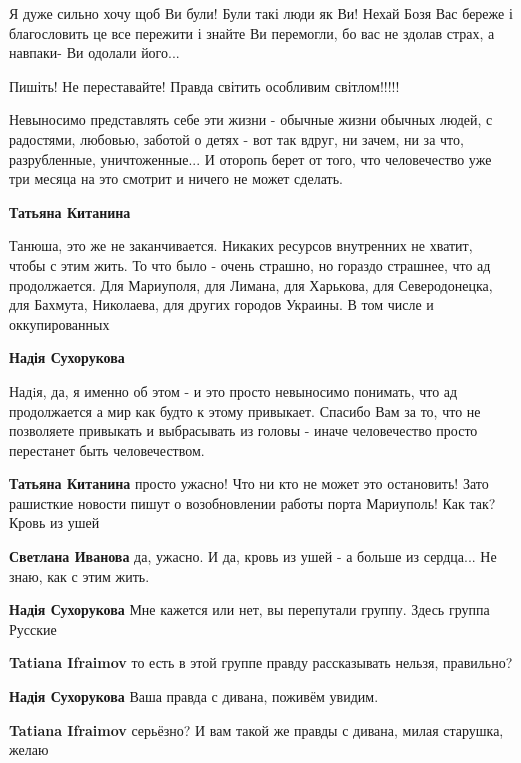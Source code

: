 \begin{itemize}

Я дуже сильно хочу щоб Ви були! Були такі люди як Ви! Нехай Бозя Вас береже і
благословить це все пережити і знайте Ви перемогли, бо вас не здолав страх, а
навпаки- Ви одолали його...

Пишіть! Не переставайте! Правда світить особливим світлом!!!!!


Невыносимо представлять себе эти жизни - обычные жизни обычных людей, с
радостями, любовью, заботой о детях - вот так вдруг, ни зачем, ни за что,
разрубленные, уничтоженные... И оторопь берет от того, что человечество уже три
месяца на это смотрит и ничего не может сделать.

\begin{itemize} %
\textbf{Татьяна Китанина} 

Танюша, это же не заканчивается. Никаких ресурсов внутренних не хватит, чтобы с
этим жить. То что было - очень страшно, но гораздо страшнее, что ад
продолжается. Для Мариуполя, для Лимана, для Харькова, для Северодонецка, для
Бахмута, Николаева, для других городов Украины. В том числе и оккупированных

\textbf{Надія Сухорукова} 

Надiя, да, я именно об этом - и это просто невыносимо понимать, что ад
продолжается а мир как будто к этому привыкает. Спасибо Вам за то, что не
позволяете привыкать и выбрасывать из головы - иначе человечество просто
перестанет быть человечеством.

\textbf{Татьяна Китанина} просто ужасно!
Что ни кто не может это остановить!
Зато рашисткие новости пишут о возобновлении работы порта Мариуполь!
Как так?
Кровь из ушей

\textbf{Светлана Иванова} да, ужасно. И да, кровь из ушей - а больше из сердца... Не знаю, как с этим жить.

\textbf{Надія Сухорукова} Мне кажется или нет, вы перепутали группу. Здесь группа Русские

\textbf{Tatiana Ifraimov} то есть в этой группе правду рассказывать нельзя, правильно?

\textbf{Надія Сухорукова} Ваша правда с дивана, поживём увидим.

\textbf{Tatiana Ifraimov} серьёзно? И вам такой же правды с дивана, милая старушка, желаю


\end{itemize}
\end{itemize}
